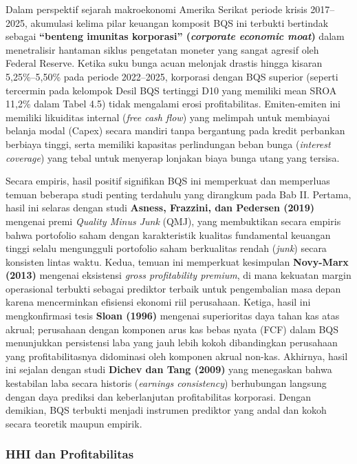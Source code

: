 \documentclass[12pt,a4paper]{article}
\begin{document}
Dalam perspektif sejarah makroekonomi Amerika Serikat periode krisis
2017--2025, akumulasi kelima pilar keuangan komposit BQS ini terbukti
bertindak sebagai \textbf{``benteng imunitas korporasi''
(\emph{corporate economic moat})} dalam menetralisir hantaman siklus
pengetatan moneter yang sangat agresif oleh Federal Reserve. Ketika suku
bunga acuan melonjak drastis hingga kisaran 5,25\%--5,50\% pada periode
2022--2025, korporasi dengan BQS superior (seperti tercermin pada
kelompok Desil BQS tertinggi D10 yang memiliki mean SROA 11,2\% dalam
Tabel 4.5) tidak mengalami erosi profitabilitas. Emiten-emiten ini
memiliki likuiditas internal (\emph{free cash flow}) yang melimpah untuk
membiayai belanja modal (Capex) secara mandiri tanpa bergantung pada
kredit perbankan berbiaya tinggi, serta memiliki kapasitas perlindungan
beban bunga (\emph{interest coverage}) yang tebal untuk menyerap
lonjakan biaya bunga utang yang tersisa.

Secara empiris, hasil positif signifikan BQS ini memperkuat dan
memperluas temuan beberapa studi penting terdahulu yang dirangkum pada
Bab II. Pertama, hasil ini selaras dengan studi \textbf{Asness,
Frazzini, dan Pedersen (2019)} mengenai premi \emph{Quality Minus Junk}
(QMJ), yang membuktikan secara empiris bahwa portofolio saham dengan
karakteristik kualitas fundamental keuangan tinggi selalu mengungguli
portofolio saham berkualitas rendah (\emph{junk}) secara konsisten
lintas waktu. Kedua, temuan ini memperkuat kesimpulan \textbf{Novy-Marx
(2013)} mengenai eksistensi \emph{gross profitability premium}, di mana
kekuatan margin operasional terbukti sebagai prediktor terbaik untuk
pengembalian masa depan karena mencerminkan efisiensi ekonomi riil
perusahaan. Ketiga, hasil ini mengkonfirmasi tesis \textbf{Sloan (1996)}
mengenai superioritas daya tahan kas atas akrual; perusahaan dengan
komponen arus kas bebas nyata (FCF) dalam BQS menunjukkan persistensi
laba yang jauh lebih kokoh dibandingkan perusahaan yang
profitabilitasnya didominasi oleh komponen akrual non-kas. Akhirnya,
hasil ini sejalan dengan studi \textbf{Dichev dan Tang (2009)} yang
menegaskan bahwa kestabilan laba secara historis (\emph{earnings
consistency}) berhubungan langsung dengan daya prediksi dan
keberlanjutan profitabilitas korporasi. Dengan demikian, BQS terbukti
menjadi instrumen prediktor yang andal dan kokoh secara teoretik maupun
empirik.

\subsubsection{HHI dan Profitabilitas}\label{hhi-dan-profitabilitas}
\end{document}

